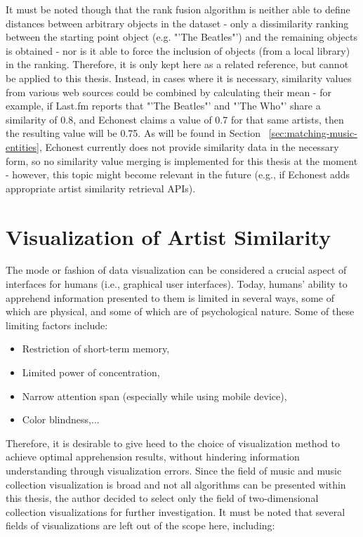 It must be noted though that the rank fusion algorithm is neither able to define distances between arbitrary objects in the dataset - only a dissimilarity ranking between the starting point object (e.g. "'The Beatles"') and the remaining objects is obtained - nor is it able to force the inclusion of objects (from a local library) in the ranking. Therefore, it is only kept here as a related reference, but cannot be applied to this thesis. Instead, in cases where it is necessary, similarity values from various web sources could be combined by calculating their mean - for example, if Last.fm reports that "'The Beatles"' and "'The Who"' share a similarity of 0.8, and Echonest claims a value of 0.7 for that same artists, then the resulting value will be 0.75. As will be found in Section ~\ref{sec:matching-music-entities}, Echonest currently does not provide similarity data in the necessary form, so no similarity value merging is implemented for this thesis at the moment - however, this topic might become relevant in the future (e.g., if Echonest adds appropriate artist similarity retrieval APIs).

\section{Visualization of Artist Similarity}
\label{sec:artist-similarity-vis}

The mode or fashion of data visualization can be considered a crucial aspect of interfaces for humans (i.e., graphical user interfaces). Today, humans' ability to apprehend information presented to them is limited in several ways, some of which are physical, and some of which are of psychological nature. Some of these limiting factors include:

\begin{itemize}
	\item Restriction of short-term memory,
	\item Limited power of concentration,
	\item Narrow attention span (especially while using mobile device),
	\item Color blindness,...
\end{itemize}

Therefore, it is desirable to give heed to the choice of visualization method to achieve optimal apprehension results, without hindering information understanding through visualization errors. Since the field of music and music collection visualization is broad and not all algorithms can be presented within this thesis, the author decided to select only the field of two-dimensional collection visualizations for further investigation. It must be noted that several fields of visualizations are left out of the scope here, including:

